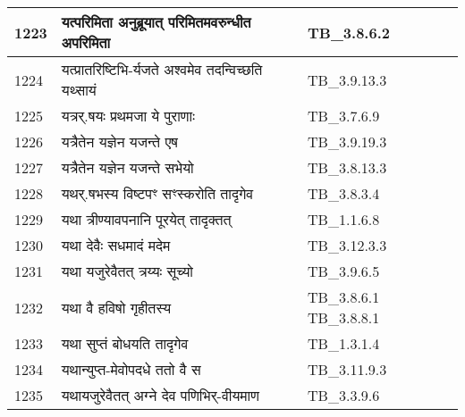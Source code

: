 \documentclass[17pt]{extarticle}
\begin{document}
\begin{longtable}{||p{0.4in}||p{4.9in}||p{0.9in}||}
    1223 & यत्परिमिता अनुब्रूयात् परिमितमवरुन्धीत अपरिमिता & TB\_3.8.6.2       \\
    
    \hline
        
    1224 & यत्प्रातरिष्टिभि{-}र्यजते अश्वमेव तदन्विच्छति यथ्सायं & TB\_3.9.13.3       \\
    
    \hline
        
    1225 & यत्रर्.षयः प्रथमजा ये पुराणाः & TB\_3.7.6.9       \\
    
    \hline
        
    1226 & यत्रैतेन यज्ञेन यजन्ते एष & TB\_3.9.19.3       \\
    
    \hline
        
    1227 & यत्रैतेन यज्ञेन यजन्ते सभेयो & TB\_3.8.13.3       \\
    
    \hline
        
    1228 & यथर्.षभस्य विष्टपꣳ सꣳस्करोति तादृगेव & TB\_3.8.3.4       \\
    
    \hline
        
    1229 & यथा त्रीण्यावपनानि पूरयेत् तादृक्तत् & TB\_1.1.6.8       \\
    
    \hline
        
    1230 & यथा देवैः सधमादं मदेम & TB\_3.12.3.3       \\
    
    \hline
        
    1231 & यथा यजुरेवैतत् त्रय्यः सूच्यो & TB\_3.9.6.5       \\
    
    \hline
        
    1232 & यथा वै हविषो गृहीतस्य & TB\_3.8.6.1 TB\_3.8.8.1       \\
    
    \hline
        
    1233 & यथा सुप्तं बोधयति तादृगेव & TB\_1.3.1.4       \\
    
    \hline
        
    1234 & यथान्युप्त{-}मेवोपदधे ततो वै स & TB\_3.11.9.3       \\
    
    \hline
        
    1235 & यथायजुरेवैतत् अग्ने देव पणिभिर्{-}वीयमाण & TB\_3.3.9.6       \\
    

\end{longtable}
\end{document}

